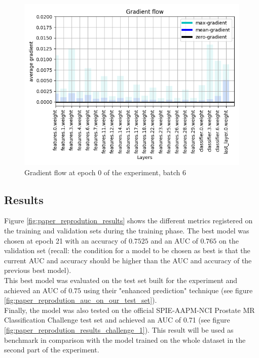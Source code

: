 \begin{figure}[!h]
\centering
\includegraphics[width=1\textwidth, keepaspectratio=true]{./figures/gradient_flow.png}
\caption{Gradient flow at epoch 0 of the experiment, batch 6}
\label{fig:gradient_flow}
\end{figure}


\subsection{Results}
\label{sec:paper_reproduction_results}
\setlength{\marginparwidth}{3cm}\leavevmode {}Figure \ref{fig:paper_reprodution_results} shows the different metrics registered on the training and validation sets during the training phase. The best model was chosen at epoch 21 with an accuracy of $0.7525$ and an AUC of $0.765$ on the validation set (recall: the condition for a model to be chosen as best is that the current AUC and accuracy should be higher than the AUC and accuracy of the previous best model).\\
This best model was evaluated on the test set built for the experiment and achieved an AUC of $0.75$ using their "enhanced prediction" technique (see figure \ref{fig:paper_reprodution_auc_on_our_test_set}).\\
Finally, the model was also tested on the official SPIE-AAPM-NCI Prostate MR Classification Challenge test set and achieved an AUC of 0.71 (see figure \ref{fig:paper_reprodution_results_challenge_1}). This result will be used as benchmark in comparison with the model trained on the whole dataset in the second part of the experiment.

